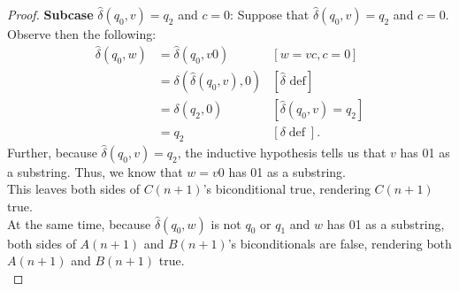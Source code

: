 \documentclass[10pt]{article}
\begin{document}
\begin{enumerate}[label={}]
\begin{proof}
              \textbf{Subcase }$\hat{\delta}\left(q_0, v\right)=q_2$ and $c=0$: Suppose that $\hat{\delta}\left(q_0, v\right)=q_2$ and $c=0$. Observe then the following:
              $$
                  \begin{aligned}
                      \hat{\delta}\left(q_0, w\right) & =\hat{\delta}\left(q_0, v 0\right)                     & {[w=v c, c=0] }                                     \\
                                                      & =\delta\left(\hat{\delta}\left(q_0, v\right), 0\right) & {[\hat{\delta} \text { def}] }                      \\
                                                      & =\delta\left(q_2, 0\right)                             & {\left[\hat{\delta}\left(q_0, v\right)=q_2\right] } \\
                                                      & =q_2                                                   & {[\delta \operatorname{def}] . }
                  \end{aligned}
              $$
              Further, because $\hat{\delta}\left(q_0, v\right)=q_2$, the inductive hypothesis tells us that $v$ has 01 as a substring. Thus, we know that $w=v0$ has 01 as a substring.\\
              This leaves both sides of $C(n+1)$'s biconditional true, rendering $C(n+1)$ true.\\
              At the same time, because $\hat{\delta}\left(q_0, w\right)$ is not $q_0$ or $q_1$ and $w$ has 01 as a substring, both sides of $A(n+1)$ and $B(n+1)$'s biconditionals are false, rendering both $A(n+1)$ and $B(n+1)$ true.\\


\end{proof}
\end{enumerate}
\end{document}
